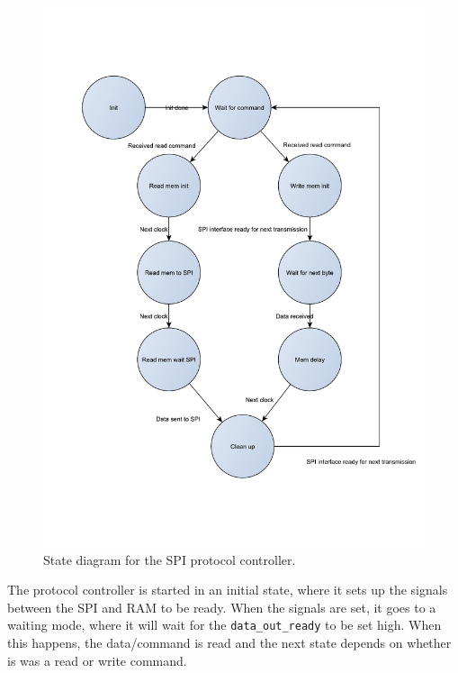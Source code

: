 \begin{figure}[htb] 
	\centering
	\includegraphics[scale=0.6,clip,trim=0 100 0 100]{graphics/spi_protocol_controller_prettystates.pdf} %
	\caption{State diagram for the SPI protocol controller.}
	\label{fig:spi_protocol_controller_prettystates}
\end{figure}



The protocol controller is started in an initial state, where it sets up the signals between the SPI and RAM to be ready. When the signals are set, it goes to a waiting mode, where it will wait for the \texttt{data\_out\_ready} to be set high. When this happens, the data/command is read and the next state depends on whether is was a read or write command.

